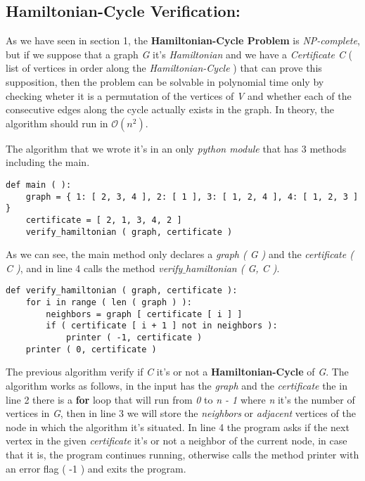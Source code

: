 \subsection{Hamiltonian-Cycle Verification:}

As we have seen in section 1, the {\bfseries Hamiltonian-Cycle Problem} is {\itshape NP-complete}, but if we suppose that a graph {\itshape G} it's {\itshape Hamiltonian} and we have a {\itshape Certificate C} ( list of vertices in order along the {\itshape Hamiltonian-Cycle} ) that can prove this supposition, then the problem can be solvable in polynomial time only by checking wheter it is a permutation of the vertices of {\itshape V} and whether each of the consecutive edges along the cycle actually exists in the graph. In theory, the algorithm should run in {\bfseries $\mathcal{O}(n^{2})$}. \hfill \break

The algorithm that we wrote it's in an only {\itshape python module} that has 3 methods including the main. \hfill \break

\begin{lstlisting}
def main ( ):
    graph = { 1: [ 2, 3, 4 ], 2: [ 1 ], 3: [ 1, 2, 4 ], 4: [ 1, 2, 3 ] }
    certificate = [ 2, 1, 3, 4, 2 ]
    verify_hamiltonian ( graph, certificate )
\end{lstlisting} \hfill \break

As we can see, the main method only declares a {\itshape graph ( G )} and the {\itshape certificate ( C )}, and in line 4 calls the method {\itshape verify$\_$hamiltonian ( G, C )}. \hfill \break

\begin{lstlisting}
def verify_hamiltonian ( graph, certificate ):
    for i in range ( len ( graph ) ):
        neighbors = graph [ certificate [ i ] ]
        if ( certificate [ i + 1 ] not in neighbors ):
            printer ( -1, certificate )
    printer ( 0, certificate )
\end{lstlisting} \hfill \break

The previous algorithm verify if {\itshape C} it's or not a {\bfseries Hamiltonian-Cycle} of {\itshape G}. The algorithm works as follows, in the input has the {\itshape graph} and the {\itshape certificate} the in line 2 there is a {\bfseries for} loop that will run from {\itshape 0} to {\itshape n - 1} where {\itshape n} it's the number of vertices in {\itshape G}, then in line 3 we will store the {\itshape neighbors} or {\itshape adjacent} vertices of the node in which the algorithm it's situated. In line 4 the program asks if the next vertex in the given {\itshape certificate} it's or not a neighbor of the current node, in case that it is, the program continues running, otherwise calls the method printer with an error flag ( -1 ) and exits the program. \hfill \break


